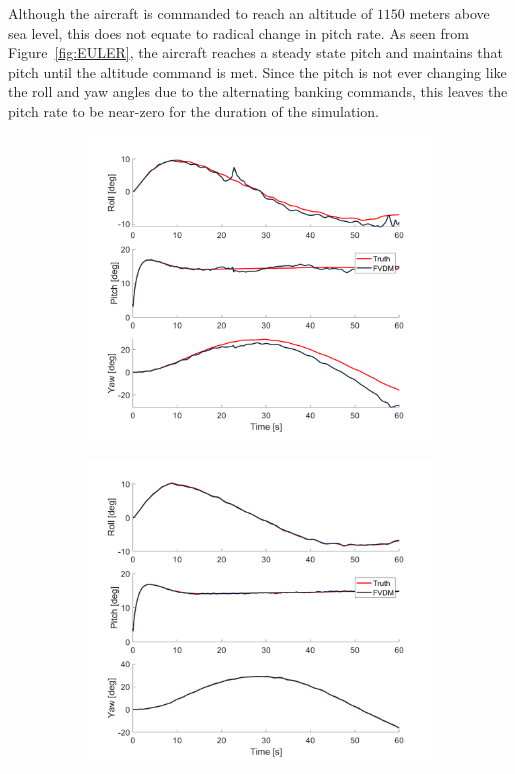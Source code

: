 Although the aircraft is commanded to reach an altitude of \(1150\) meters above sea level, this does not equate to radical change in pitch rate. As seen from Figure~\ref{fig:EULER}, the aircraft reaches a steady state pitch and maintains that pitch until the altitude command is met. Since the pitch is not ever changing like the roll and yaw angles due to the alternating banking commands, this leaves the pitch rate to be near-zero for the duration of the simulation.

\begin{figure}[!ht]
    \begin{subfigure}{.45\textwidth}
        \centering
        \includegraphics[width=1\linewidth]{Figures/dynamic/18/EULERANGLES.png}
    \end{subfigure}
    \begin{subfigure}{.45\textwidth}
        \centering
        \includegraphics[width=1\linewidth]{Figures/dynamic/20/EULERANGLES.png}

\end{subfigure}
\end{figure}
